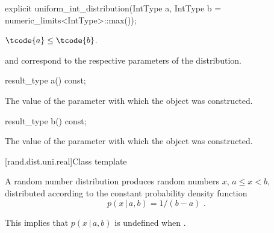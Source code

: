 %
\begin{itemdecl}
explicit uniform_int_distribution(IntType a, IntType b = numeric_limits<IntType>::max());
\end{itemdecl}

\begin{itemdescr}
\pnum
\expects
$\tcode{a} \leq \tcode{b}$.

\pnum
\remarks
  and 
 correspond to the respective parameters of the distribution.
\end{itemdescr}

%
\begin{itemdecl}
result_type a() const;
\end{itemdecl}

\begin{itemdescr}
\pnum
\returns
The value of the  parameter
 with which the object was constructed.
\end{itemdescr}

%
\begin{itemdecl}
result_type b() const;
\end{itemdecl}

\begin{itemdescr}
\pnum
\returns
The value of the  parameter
 with which the object was constructed.
\end{itemdescr}


[rand.dist.uni.real]{Class template }%
%
%

\pnum
A  random number distribution
produces random numbers $x$,
$a \leq x < b$,
distributed according to
the constant probability density function%
%
%
\[ p(x\,|\,a,b) = 1 / (b - a) \text{ .} \]
\begin{note}
This implies that $p(x\,|\,a,b)$ is undefined when .
\end{note}

